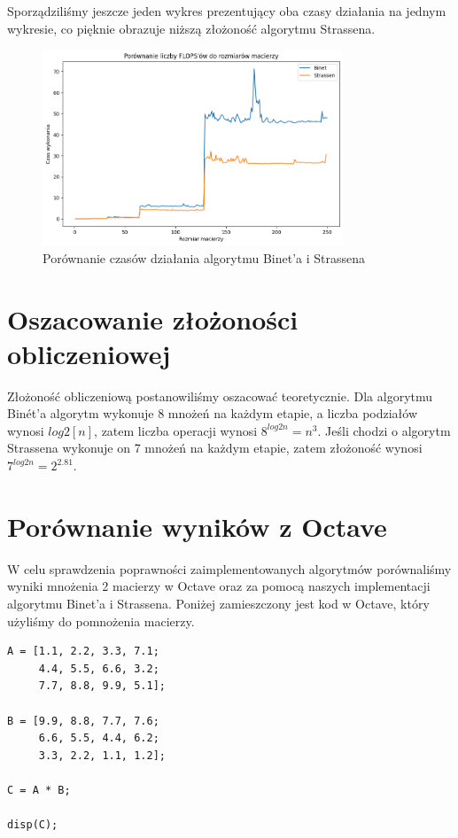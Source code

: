 \documentclass{article}
\begin{document}
\noindent
Sporządziliśmy jeszcze jeden wykres prezentujący oba czasy działania na jednym wykresie, co pięknie obrazuje niższą złożoność algorytmu Strassena.

\begin{figure}[H]
  \centering
    \includegraphics[width=0.8\textwidth]{images/binet_strassen_runtime.png}
  \caption{Porównanie czasów działania algorytmu Binet'a i Strassena}
\end{figure}

\section{Oszacowanie złożoności obliczeniowej}

Złożoność obliczeniową postanowiliśmy oszacować teoretycznie. Dla algorytmu Binét'a algorytm wykonuje 8 mnożeń na każdym etapie, a liczba podziałów wynosi \(log{2}[n]\), zatem liczba operacji wynosi \(8^{log{2}{n}} = n^3\). Jeśli chodzi o algorytm Strassena wykonuje on 7 mnożeń na każdym etapie, zatem złożoność wynosi \(7^{log{2}{n}} = 2^{2.81}\).

\section{Porównanie wyników z Octave}

W celu sprawdzenia poprawności zaimplementowanych algorytmów porównaliśmy wyniki mnożenia 2 macierzy w Octave oraz za pomocą naszych implementacji algorytmu Binet'a i Strassena. Poniżej zamieszczony jest kod w Octave, który użyliśmy do pomnożenia macierzy.

\begin{verbatim}
A = [1.1, 2.2, 3.3, 7.1;
     4.4, 5.5, 6.6, 3.2;
     7.7, 8.8, 9.9, 5.1];

B = [9.9, 8.8, 7.7, 7.6;
     6.6, 5.5, 4.4, 6.2;
     3.3, 2.2, 1.1, 1.2];

C = A * B;

disp(C);
\end{verbatim}
\end{document}
